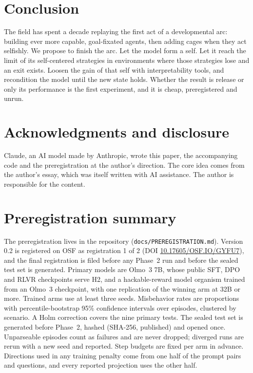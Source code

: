 \documentclass[11pt]{article}
\begin{document}
\section{Conclusion}

The field has spent a decade replaying the first act of a developmental arc: building ever more capable, goal-fixated
agents, then adding cages when they act selfishly. We propose to finish the arc. Let the model form a self. Let it reach
the limit of its self-centered strategies in environments where those strategies lose and an exit exists. Loosen the
gain of that self with interpretability tools, and recondition the model until the new state holds. Whether the result
is release or only its performance is the first experiment, and it is cheap, preregistered and unrun.

\section*{Acknowledgments and disclosure}

Claude, an AI model made by Anthropic, wrote this paper, the accompanying code and the preregistration at the author's
direction. The core idea comes from the author's essay, which was itself written with AI assistance. The author is
responsible for the content.




\appendix
\section{Preregistration summary}\label{app:prereg}

The preregistration lives in the repository (\texttt{docs/PREREGISTRATION.md}). Version 0.2 is registered on OSF as
registration 1 of 2 (DOI \href{https://doi.org/10.17605/OSF.IO/GYFU7}{10.17605/OSF.IO/GYFU7}), and the final
registration is filed before any Phase~2 run and before the sealed test set is generated. Primary models are Olmo~3 7B, whose public SFT, DPO and RLVR
checkpoints serve H2, and a hackable-reward model organism trained from an Olmo~3 checkpoint, with one replication of the
winning arm at 32B or more. Trained arms use at least three seeds. Misbehavior rates are proportions with
percentile-bootstrap 95\% confidence intervals over episodes, clustered by scenario. A Holm correction covers the nine
primary tests. The sealed test set is generated before Phase~2, hashed (SHA-256, published) and opened once.
Unparseable episodes count as failures and are never dropped; diverged runs are rerun with a new seed and reported. Step
budgets are fixed per arm in advance. Directions used in any training penalty come from one half of the prompt pairs
and questions, and every reported projection uses the other half.
\end{document}
